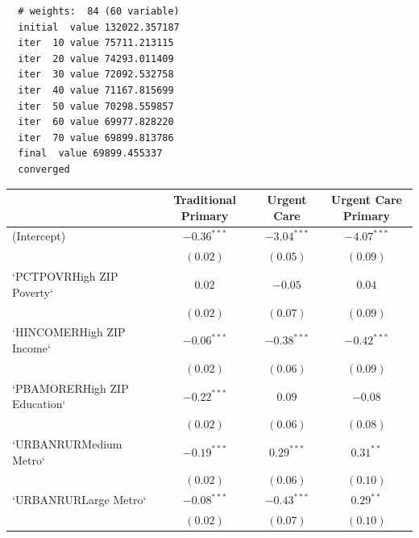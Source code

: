 \documentclass[12pt,twoside]{reedthesis}
\begin{document}
  \begin{verbatim}
  # weights:  84 (60 variable)
  initial  value 132022.357187 
  iter  10 value 75711.213115
  iter  20 value 74293.011409
  iter  30 value 72092.532758
  iter  40 value 71167.815699
  iter  50 value 70298.559857
  iter  60 value 69977.828220
  iter  70 value 69899.813786
  final  value 69899.455337 
  converged
  \end{verbatim}
  
  \singlespacing
  
  \begin{table}
  \begin{center}
  \begin{footnotesize}
  \begin{tabular}{l c c c }
  \hline
   & Traditional Primary & Urgent Care & Urgent Care Primary \\
  \hline
  (Intercept)                  & $\mathbf{-0.36}^{***}$ & $\mathbf{-3.04}^{***}$ & $\mathbf{-4.07}^{***}$ \\
                               & $(0.02)$               & $(0.05)$               & $(0.09)$               \\
  `PCTPOVRHigh ZIP Poverty`    & $0.02$                 & $-0.05$                & $0.04$                 \\
                               & $(0.02)$               & $(0.07)$               & $(0.09)$               \\
  `HINCOMERHigh ZIP Income`    & $-0.06^{***}$          & $\mathbf{-0.38}^{***}$ & $\mathbf{-0.42}^{***}$ \\
                               & $(0.02)$               & $(0.06)$               & $(0.09)$               \\
  `PBAMORERHigh ZIP Education` & $\mathbf{-0.22}^{***}$ & $0.09$                 & $-0.08$                \\
                               & $(0.02)$               & $(0.06)$               & $(0.08)$               \\
  `URBANRURMedium Metro`       & $\mathbf{-0.19}^{***}$ & $\mathbf{0.29}^{***}$  & $0.31^{**}$            \\
                               & $(0.02)$               & $(0.06)$               & $(0.10)$               \\
  `URBANRURLarge Metro`        & $-0.08^{***}$          & $\mathbf{-0.43}^{***}$ & $0.29^{**}$            \\
                               & $(0.02)$               & $(0.07)$               & $(0.10)$               \\

\end{tabular}
\end{footnotesize}
\end{center}
\end{table}
\end{document}
